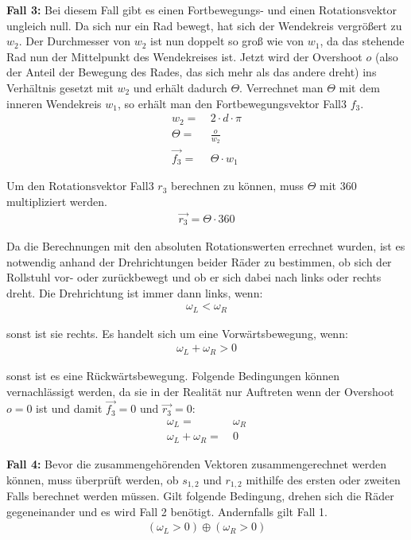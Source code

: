 \textbf{Fall 3:}
Bei diesem Fall gibt es einen Fortbewegungs- und einen Rotationsvektor ungleich null.
Da sich nur ein Rad bewegt, hat sich der Wendekreis vergrößert zu $w_2$.
Der Durchmesser von $w_2$ ist nun doppelt so groß wie von $w_1$, da das stehende Rad nun der Mittelpunkt des Wendekreises ist.
Jetzt wird der Overshoot $o$ (also der Anteil der Bewegung des Rades, das sich mehr als das andere dreht) ins Verhältnis gesetzt mit $w_2$ und erhält dadurch $\Theta$.
Verrechnet man $\Theta$ mit dem inneren Wendekreis $w_1$, so erhält man den Fortbewegungsvektor Fall3 $f_3$.
\begin{align}
    w_2 =       & \ 2 \cdot d \cdot \pi \\
    \Theta =    & \ \frac {o} {w_2}     \\
    \vec{f_3} = & \ \Theta \cdot w_1
\end{align}

Um den Rotationsvektor Fall3 $r_3$ berechnen zu können, muss $\Theta$ mit $360$ multipliziert werden.
\begin{align}
    \vec{r_3} = \Theta \cdot 360
\end{align}

Da die Berechnungen mit den absoluten Rotationswerten errechnet wurden, ist es notwendig anhand der Drehrichtungen beider Räder zu bestimmen, ob sich der Rollstuhl vor- oder zurückbewegt und ob er sich dabei nach links oder rechts dreht.
Die Drehrichtung ist immer dann links, wenn:
\begin{align}
    \omega_L < \omega_R
\end{align}

sonst ist sie rechts.
Es handelt sich um eine Vorwärtsbewegung, wenn:
\begin{align}
    \omega_L + \omega_R > 0
\end{align}

sonst ist es eine Rückwärtsbewegung.
Folgende Bedingungen können vernachlässigt werden, da sie in der Realität nur Auftreten wenn der Overshoot $o = 0$ ist und damit $\vec{f_3} = 0$ und $\vec{r_3} = 0$:
\begin{align}
    \omega_L =            & \ \omega_R \\
    \omega_L + \omega_R = & \ 0
\end{align}

\textbf{Fall 4:}
Bevor die zusammengehörenden Vektoren zusammengerechnet werden können, muss überprüft werden, ob $s_{1,2}$ und $r_{1,2}$ mithilfe des ersten oder zweiten Falls berechnet werden müssen.
Gilt folgende Bedingung, drehen sich die Räder gegeneinander und es wird Fall 2 benötigt.
Andernfalls gilt Fall 1.
\begin{align}
    (\omega_L > 0) \oplus (\omega_R > 0)
\end{align}

